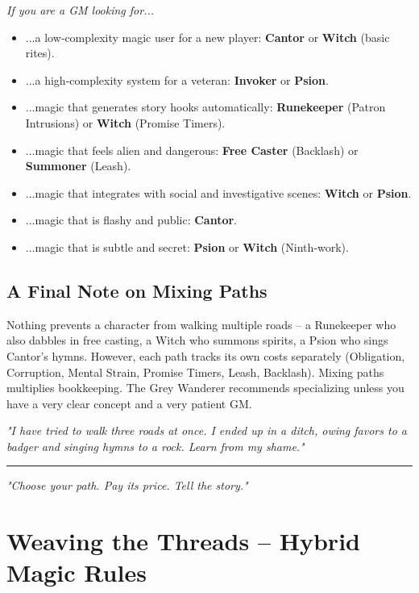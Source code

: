 \documentclass[10pt,a5paper]{book}
\begin{document}
\noindent \textit{If you are a GM looking for...}

\begin{itemize}
    \item ...a low‑complexity magic user for a new player: \textbf{Cantor} or \textbf{Witch} (basic rites).
    \item ...a high‑complexity system for a veteran: \textbf{Invoker} or \textbf{Psion}.
    \item ...magic that generates story hooks automatically: \textbf{Runekeeper} (Patron Intrusions) or \textbf{Witch} (Promise Timers).
    \item ...magic that feels alien and dangerous: \textbf{Free Caster} (Backlash) or \textbf{Summoner} (Leash).
    \item ...magic that integrates with social and investigative scenes: \textbf{Witch} or \textbf{Psion}.
    \item ...magic that is flashy and public: \textbf{Cantor}.
    \item ...magic that is subtle and secret: \textbf{Psion} or \textbf{Witch} (Ninth‑work).
\end{itemize}

\section*{A Final Note on Mixing Paths}

Nothing prevents a character from walking multiple roads -- a Runekeeper who also dabbles in free casting, a Witch who summons spirits, a Psion who sings Cantor's hymns. However, each path tracks its own costs separately (Obligation, Corruption, Mental Strain, Promise Timers, Leash, Backlash). Mixing paths multiplies bookkeeping. The Grey Wanderer recommends specializing unless you have a very clear concept and a very patient GM.

\textit{"I have tried to walk three roads at once. I ended up in a ditch, owing favors to a badger and singing hymns to a rock. Learn from my shame."}

\vspace{0.5cm}
\hrule
\vspace{0.2cm}
\begin{center}
\small \textit{"Choose your path. Pay its price. Tell the story."}
\end{center}

\chapter{Weaving the Threads -- Hybrid Magic Rules}
\end{document}
